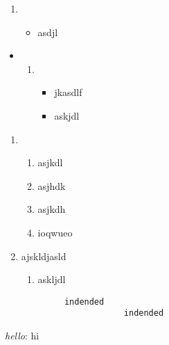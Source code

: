 \documentclass{article}
\begin{document}
    \begin{enumerate}
        \item {
        \begin{itemize}
            \item {
            asdjl
            }
        \end{itemize}
        }
    \end{enumerate}

    \begin{itemize}
        \item {
        \begin{enumerate}
            \item {
            \begin{itemize}
                \item jkasdlf
                \item {
                askjdl
                }
            \end{itemize}
            }
        \end{enumerate}
        }
    \end{itemize}

    \begin{enumerate}
        \item {
        \begin{enumerate}
            \item asjkdl
            \item {
            asjhdk
            }
            \item {asjkdh}
            \item {
            ioqwueo
            }
        \end{enumerate}
        }
        \item {
        ajskldjasld
        }
        \begin{enumerate}
            \item askljdl
        \end{enumerate}
    \end{enumerate}

    \begin{verbatim}
            indended
                        indended
    \end{verbatim}

    \textit{hello}: hi
\end{document}
